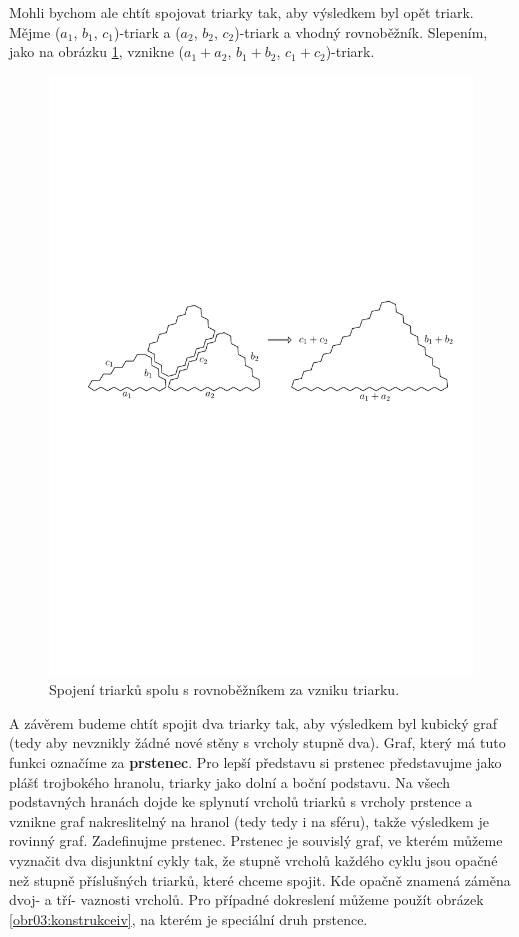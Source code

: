 Mohli bychom ale chtít spojovat triarky tak, aby výsledkem byl opět triark. Mějme ($a_1$, $b_1$, $c_1$)-triark a ($a_2$, $b_2$, $c_2$)-triark a vhodný rovnoběžník. Slepením, jako na obrázku \ref{obr22:T-T}, vznikne ($a_1+a_2$, $b_1+b_2$, $c_1+c_2$)-triark. 

\begin{figure}[h!]\centering
\includegraphics[width=\textwidth]{../img/T-T}
\caption{Spojení triarků spolu s rovnoběžníkem za vzniku triarku.}
\label{obr22:T-T}
\end{figure}

A závěrem budeme chtít spojit dva triarky tak, aby výsledkem byl kubický graf (tedy aby nevznikly žádné nové stěny s vrcholy stupně dva). Graf, který má tuto funkci označíme za \textbf{prstenec}. Pro lepší představu si prstenec představujme jako plášť trojbokého hranolu, triarky jako dolní a boční podstavu. Na všech podstavných hranách dojde ke splynutí vrcholů triarků s vrcholy prstence a vznikne graf nakreslitelný na hranol (tedy tedy i na sféru), takže výsledkem je rovinný graf. Zadefinujme prstenec. Prstenec je souvislý graf, ve kterém můžeme vyznačit dva disjunktní cykly tak, že stupně vrcholů každého cyklu jsou opačné než stupně příslušných triarků, které chceme spojit. Kde opačně znamená záměna dvoj- a tří- vaznosti vrcholů. Pro případné dokreslení můžeme použít obrázek \ref{obr03:konstrukceiv}, na kterém je speciální druh prstence. 

